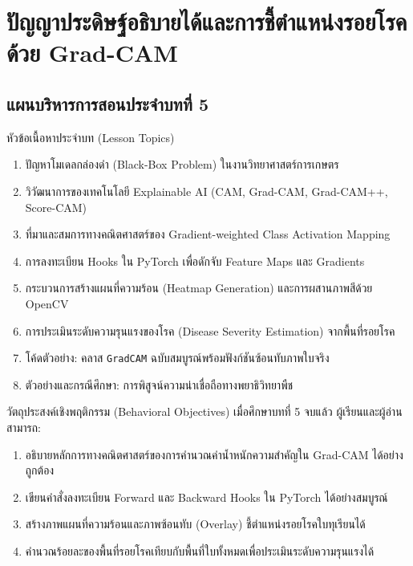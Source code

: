 \chapter{ปัญญาประดิษฐ์อธิบายได้และการชี้ตำแหน่งรอยโรคด้วย Grad-CAM}
\label{chap:explainable_ai}

\section*{แผนบริหารการสอนประจำบทที่ 5}

\begin{planbox}{หัวข้อเนื้อหาประจำบท (Lesson Topics)}
\begin{enumerate}[leftmargin=1.5em, itemsep=2pt]
    \item ปัญหาโมเดลกล่องดำ (Black-Box Problem) ในงานวิทยาศาสตร์การเกษตร
    \item วิวัฒนาการของเทคโนโลยี Explainable AI (CAM, Grad-CAM, Grad-CAM++, Score-CAM)
    \item ที่มาและสมการทางคณิตศาสตร์ของ Gradient-weighted Class Activation Mapping
    \item การลงทะเบียน Hooks ใน PyTorch เพื่อดักจับ Feature Maps และ Gradients
    \item กระบวนการสร้างแผนที่ความร้อน (Heatmap Generation) และการผสานภาพสีด้วย OpenCV
    \item การประเมินระดับความรุนแรงของโรค (Disease Severity Estimation) จากพื้นที่รอยโรค
    \item โค้ดตัวอย่าง: คลาส \texttt{GradCAM} ฉบับสมบูรณ์พร้อมฟังก์ชันซ้อนทับภาพใบจริง
    \item ตัวอย่างและกรณีศึกษา: การพิสูจน์ความน่าเชื่อถือทางพยาธิวิทยาพืช
\end{enumerate}
\end{planbox}

\begin{planbox}{วัตถุประสงค์เชิงพฤติกรรม (Behavioral Objectives)}
เมื่อศึกษาบทที่ 5 จบแล้ว ผู้เรียนและผู้อ่านสามารถ:
\begin{enumerate}[leftmargin=1.5em, itemsep=2pt]
    \item อธิบายหลักการทางคณิตศาสตร์ของการคำนวณค่าน้ำหนักความสำคัญใน Grad-CAM ได้อย่างถูกต้อง
    \item เขียนคำสั่งลงทะเบียน Forward และ Backward Hooks ใน PyTorch ได้อย่างสมบูรณ์
    \item สร้างภาพแผนที่ความร้อนและภาพซ้อนทับ (Overlay) ชี้ตำแหน่งรอยโรคใบทุเรียนได้
    \item คำนวณร้อยละของพื้นที่รอยโรคเทียบกับพื้นที่ใบทั้งหมดเพื่อประเมินระดับความรุนแรงได้
\end{enumerate}
\end{planbox}

